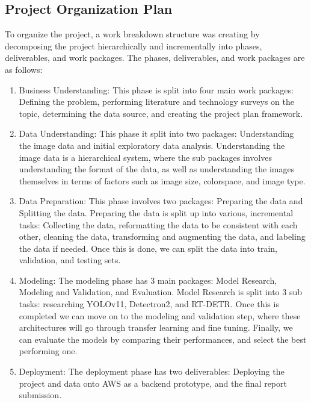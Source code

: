 \documentclass[stu,12pt,floatsintext]{apa7}
\begin{document}
\subsection{Project Organization Plan}
To organize the project, a work breakdown structure was creating by decomposing the project hierarchically and incrementally into phases, deliverables, and work packages. The phases, deliverables, and work packages are as follows:

\begin{enumerate}
	\item Business Understanding: This phase is split into four main work packages: Defining the problem, performing literature and technology surveys on the topic, determining the data source, and creating the project plan framework.

	\item Data Understanding: This phase it split into two packages: Understanding the image data and initial exploratory data analysis. Understanding the image data is a hierarchical system, where the sub packages involves understanding the format of the data, as well as understanding the images themselves in terms of factors such as image size, colorspace, and image type.

	\item Data Preparation: This phase involves two packages: Preparing the data and Splitting the data. Preparing the data is split up into various, incremental tasks: Collecting the data, reformatting the data to be consistent with each other, cleaning the data, transforming and augmenting the data, and labeling the data if needed. Once this is done, we can split the data into train, validation, and testing sets.

	\item Modeling: The modeling phase has 3 main packages: Model Research, Modeling and Validation, and Evaluation. Model Research is split into 3 sub tasks: researching YOLOv11, Detectron2, and RT-DETR. Once this is completed we can move on to the modeling and validation step, where these architectures will go through transfer learning and fine tuning. Finally, we can evaluate the models by comparing their performances, and select the best performing one.

	\item Deployment: The deployment phase has two deliverables: Deploying the project and data onto AWS as a backend prototype, and the final report submission.
\end{enumerate}
\end{document}
